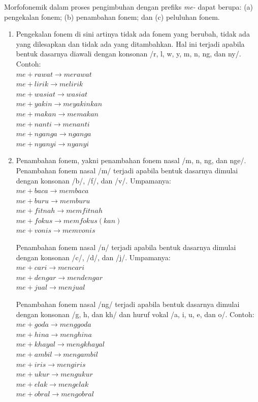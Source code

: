 Morfofonemik dalam proses pengimbuhan dengan prefiks \textit{me-} dapat berupa: (a) pengekalan fonem; (b) penambahan fonem; dan (c) peluluhan fonem.

\begin{enumerate}
	\item Pengekalan fonem di sini artinya tidak ada fonem yang berubah, tidak ada yang dilesapkan dan tidak ada yang ditambahkan. Hal ini terjadi apabila bentuk dasarnya diawali dengan konsonan /r, l, w, y, m, n, ng, dan ny/. Contoh:\\
	$me + rawat \rightarrow merawat$\\
	$me + lirik \rightarrow melirik$\\
	$me + wasiat \rightarrow wasiat$\\
	$me + yakin \rightarrow meyakinkan$\\
	$me + makan \rightarrow memakan$\\
	$me + nanti \rightarrow menanti$\\
	$me + nganga \rightarrow nganga$\\
	$me + nyanyi \rightarrow nyanyi$
	
	\item Penambahan fonem, yakni penambahan fonem nasal /m, n, ng, dan nge/. Penambahan fonem nasal /m/ terjadi apabila bentuk dasarnya dimulai dengan konsonan /b/, /f/, dan /v/. Umpamanya:\\
	$me + baca \rightarrow membaca$\\
	$me + buru \rightarrow memburu$\\
	$me + fitnah \rightarrow memfitnah$\\
	$me + fokus \rightarrow memfokus (kan)$\\
	$me + vonis \rightarrow memvonis$
	
	Penambahan fonem nasal /n/ terjadi apabila bentuk dasarnya dimulai dengan konsonan /c/, /d/, dan /j/. Umpamanya:\\
	$me + cari \rightarrow mencari$\\
	$me + dengar \rightarrow mendengar$\\
	$me + jual \rightarrow menjual$
	
	Penambahan fonem nasal /ng/ terjadi apabila bentuk dasarnya dimulai dengan konsonan /g, h, dan kh/ dan huruf vokal /a, i, u, e, dan o/. Contoh:\\
	$me + goda \rightarrow menggoda$\\
	$me + hina \rightarrow menghina$\\
	$me + khayal \rightarrow mengkhayal$\\
	$me + ambil \rightarrow mengambil$\\
	$me + iris \rightarrow mengiris$\\
	$me + ukur \rightarrow mengukur$\\
	$me + elak \rightarrow mengelak$\\
	$me + obral \rightarrow mengobral$
	

\end{enumerate}
